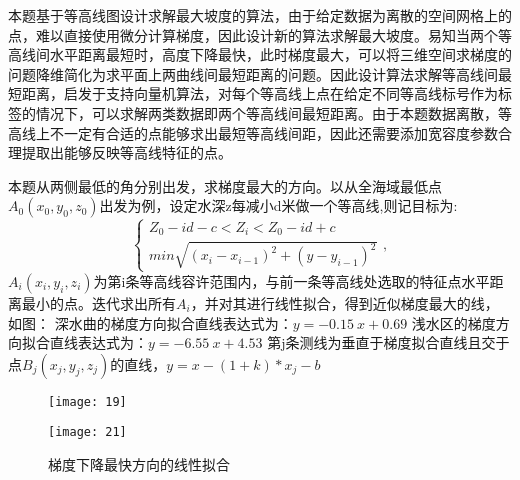 \documentclass[withoutpreface,bwprint]{cumcmthesis} %
\begin{document}
本题基于等高线图设计求解最大坡度的算法，由于给定数据为离散的空间网格上的点，难以直接使用微分计算梯度，因此设计新的算法求解最大坡度。易知当两个等高线间水平距离最短时，高度下降最快，此时梯度最大，可以将三维空间求梯度的问题降维简化为求平面上两曲线间最短距离的问题。因此设计算法求解等高线间最短距离，启发于支持向量机算法，对每个等高线上点在给定不同等高线标号作为标签的情况下，可以求解两类数据即两个等高线间最短距离。由于本题数据离散，等高线上不一定有合适的点能够求出最短等高线间距，因此还需要添加宽容度参数合理提取出能够反映等高线特征的点。

本题从两侧最低的角分别出发，求梯度最大的方向。以从全海域最低点$A_0(x_0,y_0,z_0)$出发为例，设定水深z每减小d米做一个等高线,则记目标为:
\begin{equation}
\left\{
\begin{aligned}
Z_0-id-c<Z_i<Z_0-id+c \\
min \sqrt{(x_i-x_{i-1})^2+(y-y_{i-1})^2}
\end{aligned}
\right.
,
\end{equation}
$A_i(x_i,y_i,z_i)$为第i条等高线容许范围内，与前一条等高线处选取的特征点水平距离最小的点。迭代求出所有$A_i$，并对其进行线性拟合，得到近似梯度最大的线，如图：
深水曲的梯度方向拟合直线表达式为：$y=-0.15\ x+0.69$
浅水区的梯度方向拟合直线表达式为：$y=-6.55\ x+4.53$
第j条测线为垂直于梯度拟合直线且交于点$B_j(x_j,y_j,z_j)$的直线，$y=x-(1+k)*x_j-b$

\begin{figure}[H]
    \centering
    \begin{minipage}[c]{0.48\textwidth}
        \centering
        \texttt{[image: 19]}
        \subcaption{}
    \end{minipage}
 \begin{minipage}[c]{0.48\textwidth}
        \centering
        \texttt{[image: 21]}
        \subcaption{}
    \end{minipage}
    \caption{梯度下降最快方向的线性拟合}
\end{figure}
\end{document}
